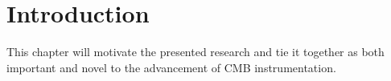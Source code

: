 \chapter{Introduction}
\label{ch:introduction}

This chapter will motivate the presented research and tie it together as both important and novel to the advancement of CMB instrumentation.